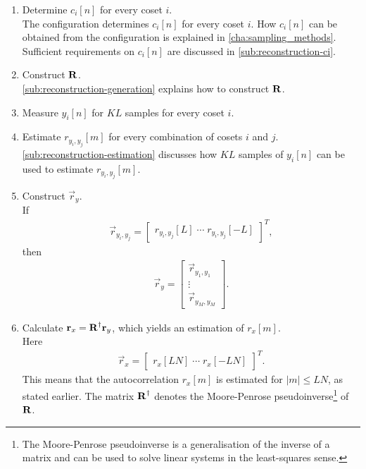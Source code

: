 \documentclass[a4paper, openany, oneside]{memoir}
\begin{document}
\begin{enumerate}[labelindent=0pt,labelwidth=\widthof{\ref{last-item1}},label=\textbf{Step \arabic*:},itemindent=1em,leftmargin=!]
    \item Determine $c_i[n]$ for every coset $i$. \\
    The configuration determines $c_i[n]$ for every coset $i$. How $c_i[n]$ can be obtained from the configuration is explained in \cref{cha:sampling_methods}. Sufficient requirements on $c_i[n]$ are discussed in \cref{sub:reconstruction-ci}.
    \item Construct $\boldsymbol{\mathbf{R}}$. \\
    \cref{sub:reconstruction-generation} explains how to construct $\boldsymbol{\mathbf{R}}$.
    \item Measure $y_i[n]$ for $KL$ samples for every coset $i$.
    \item Estimate $r_{y_i,y_j}[m]$ for every combination of cosets $i$ and $j$. \\
    \cref{sub:reconstruction-estimation} discusses how $KL$ samples of $y_i[n]$ can be used to estimate $r_{y_i,y_j}[m]$.
    \item Construct $\vec{r}_y$. \\
    If
    \begin{align*}
        \vec{r}_{y_i,y_j} = \begin{bmatrix}
            r_{y_i,y_j}[L] \; \cdots \; r_{y_i,y_j}[-L]
        \end{bmatrix}^T,
    \end{align*}
    then
    \begin{align*}
        \vec{r}_y = \begin{bmatrix}
            \vec{r}_{y_1,y_1} \\ \vdots \\ \vec{r}_{y_M,y_M}
        \end{bmatrix}.
    \end{align*}
    \item Calculate $\boldsymbol{\mathbf{r}}_x=\boldsymbol{\mathbf{R}}^\dagger \boldsymbol{\mathbf{r}}_y$, which yields an estimation of $r_x[m]$. \\
    Here
    \begin{align*}
         \vec{r}_x = \begin{bmatrix}
             r_x[LN] \; \cdots \; r_x[-LN]
         \end{bmatrix}^T.
    \end{align*} This means that the autocorrelation $r_x[m]$ is estimated for $|m| \le LN$, as stated earlier. The matrix $\boldsymbol{\mathbf{R}}^\dagger$ denotes the Moore-Penrose pseudoinverse\footnote{The Moore-Penrose pseudoinverse is a generalisation of the inverse of a matrix and can be used to solve linear systems in the least-squares sense.} of $\boldsymbol{\mathbf{R}}$.
    \label{last-item1}
\end{enumerate}
\end{document}
